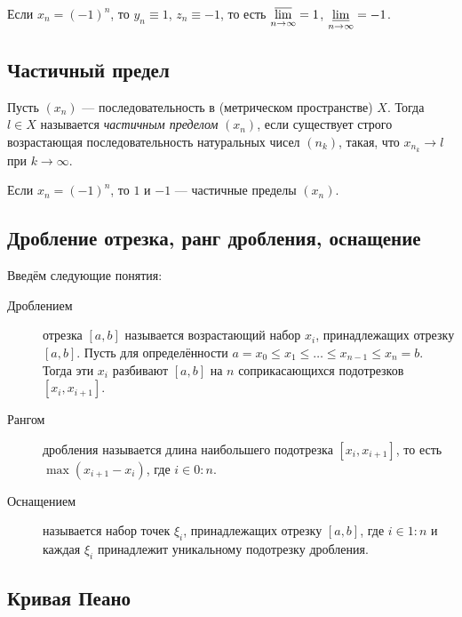 \begin{example}
	Если \(x_n = (-1)^n\), то \(y_n \equiv 1\), \(z_n \equiv -1\), то есть \(\varlimsup\limits_{n \to \infty} = 1\), \(\varliminf\limits_{n \to \infty} = -1\).
\end{example}

\subsection{Частичный предел}

\begin{definition}
	Пусть \((x_n)\) --- последовательность в (метрическом пространстве) \(X\). Тогда \(l \in X\) называется \textit{частичным пределом} \((x_n)\), если существует строго возрастающая последовательность натуральных чисел \((n_k)\), такая, что \(x_{n_k} \to l\) при \(k \to \infty\).
\end{definition}

\begin{example}
	Если \(x_n = (-1)^n\), то \(1\) и \(-1\) --- частичные пределы \((x_n)\).
\end{example}

\subsection{Дробление отрезка, ранг дробления, оснащение}

\begin{definition}
	Введём следующие понятия:
	\begin{description}
		\item[Дроблением] отрезка \([a, b]\) называется возрастающий набор \(x_i\), принадлежащих отрезку \([a, b]\). Пусть для определённости \(a = x_0 \leqslant x_1 \leqslant \ldots \leqslant x_{n - 1} \leqslant x_n = b\). Тогда эти \(x_i\) разбивают \([a, b]\) на \(n\) соприкасающихся подотрезков \([x_i, x_{i + 1}]\).
		\item[Рангом] дробления называется длина наибольшего подотрезка \([x_i, x_{i + 1}]\), то есть \(\max (x_{i + 1} - x_i)\), где \(i \in 0 : n\).
		\item[Оснащением] называется набор точек \(\xi_i\), принадлежащих отрезку \([a, b]\), где \(i \in 1 : n\) и каждая \(\xi_i\) принадлежит уникальному подотрезку дробления.
	\end{description}
\end{definition}

\subsection{\color{red} Кривая Пеано}

